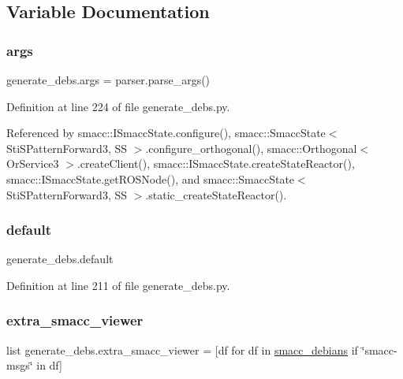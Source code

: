 \subsection{Variable Documentation}
\mbox{\label{namespacegenerate__debs_a75f9143e38df82d83b2e8a6f99cae02c}} 
\subsubsection{\texorpdfstring{args}{args}}
{\footnotesize\ttfamily generate\+\_\+debs.\+args = parser.\+parse\+\_\+args()}



Definition at line 224 of file generate\+\_\+debs.\+py.



Referenced by smacc\+::\+I\+Smacc\+State.\+configure(), smacc\+::\+Smacc\+State$<$ Sti\+S\+Pattern\+Forward3, S\+S $>$.\+configure\+\_\+orthogonal(), smacc\+::\+Orthogonal$<$ Or\+Service3 $>$.\+create\+Client(), smacc\+::\+I\+Smacc\+State.\+create\+State\+Reactor(), smacc\+::\+I\+Smacc\+State.\+get\+R\+O\+S\+Node(), and smacc\+::\+Smacc\+State$<$ Sti\+S\+Pattern\+Forward3, S\+S $>$.\+static\+\_\+create\+State\+Reactor().

\mbox{\label{namespacegenerate__debs_a3d67a92b7eb3a59c397dc9fdd1c67558}} 
\subsubsection{\texorpdfstring{default}{default}}
{\footnotesize\ttfamily generate\+\_\+debs.\+default}



Definition at line 211 of file generate\+\_\+debs.\+py.

\mbox{\label{namespacegenerate__debs_aae153eaf5f6cddad5899c36fef7e1b10}} 
\subsubsection{\texorpdfstring{extra\+\_\+smacc\+\_\+viewer}{extra\_smacc\_viewer}}
{\footnotesize\ttfamily list generate\+\_\+debs.\+extra\+\_\+smacc\+\_\+viewer = \mbox{[}df for df in \hyperlink{namespacegenerate__debs_acca5eaf9f83b81a32c26c7a7c5f9bdd7}{smacc\+\_\+debians} if \char`\"{}smacc-\/msgs\char`\"{} in df\mbox{]}}



